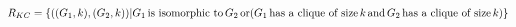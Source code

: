 




\begin{definition}$R_{KC}=\{((G_1, k), (G_2, k))| G_1 \,\text{is isomorphic to}\,
  G_2 \,\text{or}\, \\(G_1 \,\text{has a clique of size}\, k \,\text{and}\, G_2
  \,\text{has a clique of size}\, k)\}$\end{definition}


